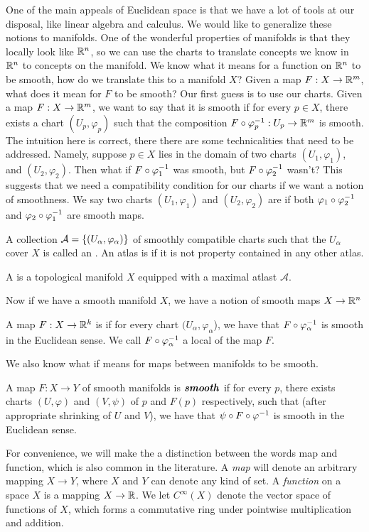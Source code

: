 %
One of the main appeals of Euclidean space is that we have a lot of tools at our disposal, like linear algebra
and calculus. We would like to generalize these notions to manifolds. One of the wonderful properties of
manifolds is that they locally look like $\mathbb{R}^n$, so we can use the charts to translate concepts we know in
$\mathbb{R}^n$ to concepts on the manifold.
%
We know what it means for a function on $\mathbb{R}^n$ to be smooth, how do we
translate this to a manifold $X$? Given a map $F : X \to \mathbb{R}^m$, what does it mean for $F$ to be smooth? Our
first guess is to use our charts. Given a map $F: X \to \mathbb{R}^m$, we want
to say that it is smooth if for every $p \in X$, there exists a chart
$(U_p, \varphi_p)$ such that the composition
$F \circ \varphi_p^{-1} : U_p \to \mathbb{R}^m$ is smooth. The intuition here
is correct, there there are some technicalities that need to be addressed.
 Namely, suppose $p \in X$ lies in the domain of two charts
 $(U_1, \varphi_1)$, and $(U_2, \varphi_2)$. Then what if
 $F \circ \varphi_1^{-1}$ was smooth, but $F \circ \varphi_2^{-1}$ wasn't?
 This suggests that we need a compatibility condition for our charts
 if we want a notion of smoothness. We say two charts $(U_1, \varphi_1)$
 and $(U_2, \varphi_2)$ are  if both
 $\varphi_1 \circ \varphi_2^{-1}$ and $\varphi_2 \circ \varphi_1^{-1}$ are
 smooth maps.
 \begin{defn}
	 A collection $\mathcal{A} = \left\lbrace (U_\alpha, \varphi_\alpha) \right\rbrace$ of
	 smoothly compatible charts such that the $U_\alpha$ cover $X$ is called
	 an . An atlas is  if it is not property contained in any other atlas.
 \end{defn}
%
\begin{defn}
	A  is a topological manifold $X$ equipped with a maximal atlast $\mathcal{A}$.
\end{defn}
%
Now if we have a smooth manifold $X$, we have a notion of smooth maps
$X \to \mathbb{R}^n$
%
\begin{defn}
	A map $F : X \to \mathbb{R}^k$ is  if for every chart
	$(U_\alpha, \varphi_\alpha$), we have that $F \circ \varphi_\alpha^{-1}$ is
	smooth in the Euclidean sense. We call $F \circ \varphi_\alpha^{-1}$ a local
	 of the map $F$.
\end{defn}
%
We also know what if means for maps between manifolds to be smooth.
%
\begin{defn}
	A map $F : X \to Y$ of smooth manifolds is $\textbf{\textit{smooth}}$ if for every $p$,
	there exists charts $(U, \varphi)$ and $(V, \psi)$ of $p$ and $F(p)$
	respectively, such that (after appropriate shrinking of $U$ and $V$), we
	have that $\psi \circ F \circ \varphi^{-1}$ is smooth in the Euclidean sense.
\end{defn}
%
For convenience, we will make the a distinction between the words map
and function, which is also common in the literature. A \emph{map} will denote
an arbitrary mapping $X \to Y$, where $X$ and $Y$ can denote any kind of set.
A \emph{function} on a space $X$ is a mapping $X \to \mathbb{R}$. We let $C^\infty(X)$
denote the vector space of functions of $X$, which forms a commutative ring
under pointwise multiplication and addition.\\

